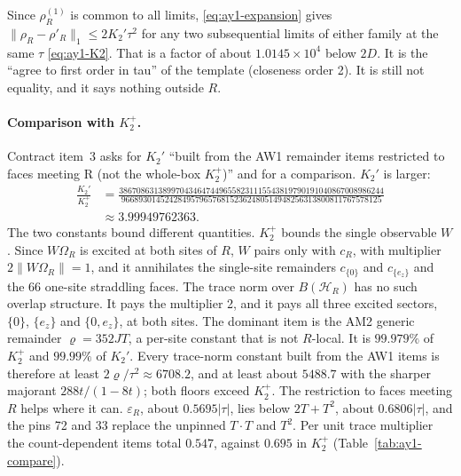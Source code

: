 Since $\rho^{(1)}_R$ is common to all limits, \eqref{eq:ay1-expansion} gives
$\lVert \rho_R-\rho'_R\rVert_1\le2K_2'\tau^2$ for any two subsequential limits of
either family at the same $\tau$ \eqref{eq:ay1-K2}. That is a factor of about
$1.0145\times10^4$ below $2D$. It is the ``agree to first order in tau'' of
the template (closeness order 2). It is still not equality, and it says
nothing outside $R$.

\paragraph{Comparison with \texorpdfstring{$K_2^+$}{K2+}.}
Contract item~3 asks for $K_2'$ ``built from the AW1 remainder items
restricted to faces meeting R (not the whole-box $K_2^+$)'' and for a
comparison. $K_2'$ is larger:
\begin{equation}
 \begin{aligned}
 \frac{K_2'}{K_2^+}
 &=\frac{3867086313899704346474496558231115543819790191040867008986244}{966893014524284957965768152362480514948256313800811767578125}\\
 &\approx3.99949762363 .
 \end{aligned}
 \label{eq:ay1-ratio}
\end{equation}
The two constants bound different quantities. $K_2^+$ bounds the single
observable $W$. Since $W\Omega_R$ is excited at both sites of $R$, $W$ pairs
only with $c_R$, with multiplier $2\lVert W\Omega_R\rVert =1$, and it annihilates
the single-site remainders $c_{\{0\}}$ and $c_{\{e_z\}}$ and the 66 one-site
straddling faces. The trace norm over $B(\mathcal H_R)$ has no such overlap
structure. It pays the multiplier 2, and it pays all three excited sectors,
$\{0\}$, $\{e_z\}$ and $\{0,e_z\}$, at both sites. The dominant item is the
AM2 generic remainder $\varrho=352JT$, a per-site constant that is not
$R$-local. It is $99.979\%$ of $K_2^+$ and $99.99\%$ of $K_2'$. Every
trace-norm constant built from the AW1 items is therefore at least
$2\varrho/\tau^2\approx6708.2$, and at least about $5488.7$ with the sharper
majorant $288t/(1-8t)$; both floors exceed $K_2^+$. The restriction to faces
meeting $R$ helps where it can. $\varepsilon_R$, about $0.5695|\tau|$, lies
below $2T+T^2$, about $0.6806|\tau|$, and the pins 72 and 33 replace the
unpinned $T\cdot T$ and $T^2$. Per unit trace multiplier the count-dependent
items total $0.547$, against $0.695$ in $K_2^+$ (Table~\ref{tab:ay1-compare}).

